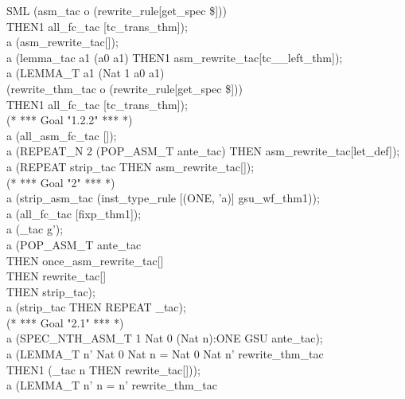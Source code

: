 {\begin{GFT}{SML}
\+	(asm\_tac o (rewrite\_rule[get\_spec \PrKM{}\$\MMM{\in}\PrJL{+}\PrKO{}]))\\
\+	THEN1 all\_fc\_tac [tc\MMM{\in}\_trans\_thm]);\\
\+a (asm\_rewrite\_tac[]);\\
\+a (lemma\_tac \PrKM{}a1 \MMM{\in}\PrJL{+} (a0 \MMM{\mapsto} a1)\PrKO{} THEN1 asm\_rewrite\_tac[tc\MMM{\in}\_\MMM{\mapsto}\_left\_thm]);\\
\+a (LEMMA\_T \PrKM{}a1 \MMM{\in}\PrJL{+} (Nat 1 \MMM{\mapsto} a0 \MMM{\mapsto} a1)\PrKO{}\\
\+	(rewrite\_thm\_tac o (rewrite\_rule[get\_spec \PrKM{}\$\MMM{\in}\PrJL{+}\PrKO{}]))\\
\+	THEN1 all\_fc\_tac [tc\MMM{\in}\_trans\_thm]);\\
\+(* *** Goal "1.2.2" *** *)\\
\+a (all\_asm\_fc\_tac []);\\
\+a (REPEAT\_N 2 (POP\_ASM\_T ante\_tac) THEN asm\_rewrite\_tac[let\_def]);\\
\+a (REPEAT strip\_tac THEN asm\_rewrite\_tac[]);\\
\+(* *** Goal "2" *** *)\\
\+a (strip\_asm\_tac (inst\_type\_rule [(\PrJE{}ONE\PrKO{}, \PrJE{}'a\PrKO{})] gsu\_wf\_thm1));\\
\+a (all\_fc\_tac [fixp\_thm1]);\\
\+a (\MMM{\exists}\_tac \PrKM{}g'\PrKO{});\\
\+a (POP\_ASM\_T ante\_tac\\
\+	THEN once\_asm\_rewrite\_tac[]\\
\+	THEN rewrite\_tac[]\\
\+	THEN strip\_tac);\\
\+a (strip\_tac THEN REPEAT \MMM{\forall}\_tac);\\
\+(* *** Goal "2.1" *** *)\\
\+a (SPEC\_NTH\_ASM\_T 1 \PrKM{}Nat 0 \MMM{\mapsto} (Nat n):ONE GSU\PrKO{} ante\_tac);\\
\+a (LEMMA\_T \PrKM{}\MMM{\exists} n'\MMM{\bullet} Nat 0 \MMM{\mapsto} Nat n = Nat 0 \MMM{\mapsto} Nat n'\PrKO{} rewrite\_thm\_tac\\
\+	THEN1 (\MMM{\exists}\_tac \PrKM{}n\PrKO{} THEN rewrite\_tac[]));\\
\+a (LEMMA\_T \PrKM{}\MMM{\exists} n'\MMM{\bullet} n = n'\PrKO{} rewrite\_thm\_tac\\

\end{GFT}}
